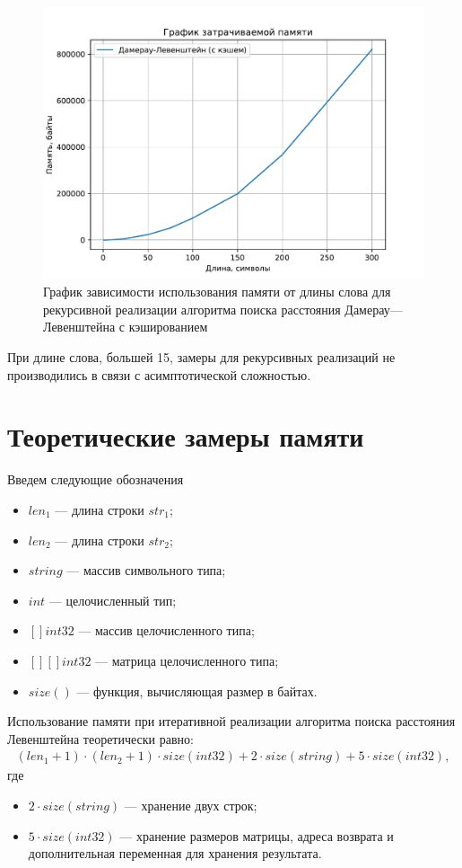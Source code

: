 \begin{figure}[H]
	\centering
	\includegraphics{assets/plots/mem-cache.pdf}
	\caption{График зависимости использования памяти от длины слова для рекурсивной реализации алгоритма поиска расстояния Дамерау---Левенштейна с кэшированием}
	\label{plt:mem-cache}
\end{figure}

При длине слова, большей 15, замеры для рекурсивных реализаций не производились в связи с асимптотической сложностью.


\section{Теоретические замеры памяти}

Введем следующие обозначения

\begin{itemize}
	\item $len_{1}$ --- длина строки $str_{1}$;
	\item $len_{2}$ --- длина строки $str_{2}$;
	\item $string$ --- массив символьного типа;
	\item $int$ --- целочисленный тип;
	\item $[]int32$ --- массив целочисленного типа;
	\item $[][]int32$ --- матрица целочисленного типа;
	\item $size()$ --- функция, вычисляющая размер в байтах.
\end{itemize}

Использование памяти при итеративной реализации алгоритма поиска расстояния Левенштейна теоретически равно:
\begin{equation}
	\begin{aligned}
		(len_{1} + 1) \cdot (len_{2} + 1) \cdot size(int32) + 2 \cdot size(string) + 5 \cdot size(int32),
	\end{aligned}
\end{equation}
где 
\begin{itemize}
	\item $2 \cdot size(string)$ --- хранение двух строк;
	\item $5 \cdot size(int32)$ --- хранение размеров матрицы, адреса возврата и дополнительная переменная для хранения результата.
\end{itemize}

